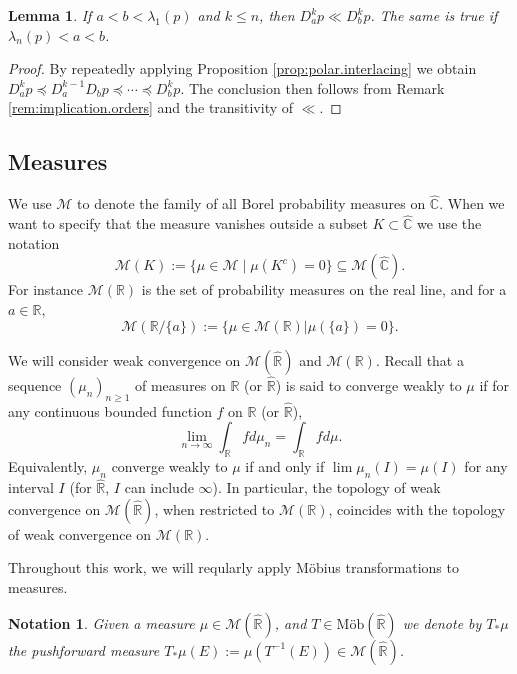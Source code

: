 \documentclass[reqno,11pt]{amsart}
\newtheorem{lemma}[theorem]{Lemma}
\newtheorem{notation}[theorem]{Notation}
\theoremstyle{remark}
\newcommand{\cc}{\mathbb{C}}
\newcommand{\rr}{\mathbb{R}}
\newcommand{\MM}{\mathcal{M}}
\newcommand{\polar}[1]{D_{#1}}
\newcommand{\mobr}{\text{Möb}(\hat{\rr})}
\begin{document}
\begin{lemma}
\label{lem:polar.derivatives.partial.order}
    If $a<b<\lambda_1(p)$ and $k\leq n$, then $ \polar{a}^kp \ll \polar{b}^kp $. The same is true if $ \lambda_{n}(p)<a<b $.
\end{lemma}
\begin{proof}
By repeatedly applying Proposition \ref{prop:polar.interlacing} we obtain
$ \polar{a}^kp \preccurlyeq  \polar{a}^{k-1}\polar{b}p \preccurlyeq\cdots \preccurlyeq\polar{b}^kp $. The conclusion then follows from Remark \ref{rem:implication.orders} and the transitivity of $\ll$.
\end{proof}


\subsection{Measures}

We use $\MM$ to denote the family of all Borel probability measures on $\hat{\cc}$. When we want to specify that the measure vanishes outside a subset $K \subset \hat{\cc}$ we use the notation
\begin{equation}
\label{eq:not.measure.vanishes}
  \MM(K) := \{\mu \in \MM \mid \mu(K^c)=0 \}\subseteq \MM(\hat{\cc}).
\end{equation}
For instance $\MM(\rr)$ is the set of probability measures on the real line, and for a $a\in \rr$, $$ \MM(\rr/\{a\}):= \{\mu \in \MM(\rr)| \mu(\{a\}) = 0\} .$$

We will consider weak convergence on $\MM(\hat{\rr})$ and $ \MM(\rr) $. Recall that a sequence $ (\mu_n)_{n\geq 1} $ of measures on $\rr$ (or $\hat{\rr}$) is said to converge weakly to $\mu $ if for any continuous bounded function $f$ on $ \rr $ (or $\hat{\rr}$), 
$$ \lim_{n\to\infty} \int_\rr f d\mu_n = \int_\rr f d\mu. $$ Equivalently, $ \mu_n $ converge weakly to $\mu$ if and only if $ \lim \mu_n(I) = \mu(I) $ for any interval $I$ (for $\hat{\rr}$, $I$ can include $ \infty $). In particular, the topology of weak convergence on $\MM(\hat{\rr})$, when restricted to $\MM(\rr)$, coincides with the topology of weak convergence on $ \MM(\rr) $.

Throughout this work, we will reqularly apply Möbius transformations to measures. 
\begin{notation}
\label{nota:mobius.measure}
Given a measure $ \mu \in \MM(\hat{\rr})$, and $ T\in\mobr$ we denote by $ T_*\mu $ the pushforward measure $ T_*\mu(E) := \mu( T^{-1}(E) )\in \MM(\hat{\rr}) $. 
\end{notation}
\end{document}
